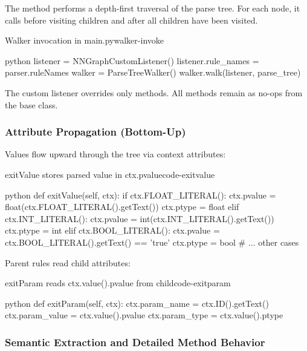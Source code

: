 \documentclass{nngraph-en}
\begin{document}
The  method performs
a depth-first traversal of the parse tree. For each node, it calls
 before visiting children and 
after all children have been visited.

\begin{dfnbox}{Walker invocation in main.py}{walker-invoke}
\begin{amzcode}{python}
listener = NNGraphCustomListener()
listener.rule_names = parser.ruleNames
walker = ParseTreeWalker()
walker.walk(listener, parse_tree)
\end{amzcode}
\end{dfnbox}

The custom listener overrides only  methods. All
 methods remain as no-ops from the base
 class.

\subsubsection{Attribute Propagation (Bottom-Up)}

Values flow upward through the tree via context attributes:

\begin{codebox}{exitValue stores parsed value in ctx.pvalue}{code-exitvalue}
\begin{amzcode}{python}
def exitValue(self, ctx):
    if ctx.FLOAT_LITERAL():
        ctx.pvalue = float(ctx.FLOAT_LITERAL().getText())
        ctx.ptype  = float
    elif ctx.INT_LITERAL():
        ctx.pvalue = int(ctx.INT_LITERAL().getText())
        ctx.ptype  = int
    elif ctx.BOOL_LITERAL():
        ctx.pvalue = ctx.BOOL_LITERAL().getText() == 'true'
        ctx.ptype  = bool
    # ... other cases
\end{amzcode}
\end{codebox}

Parent rules read child attributes:

\begin{codebox}{exitParam reads ctx.value().pvalue from child}{code-exitparam}
\begin{amzcode}{python}
def exitParam(self, ctx):
    ctx.param_name  = ctx.ID().getText()
    ctx.param_value = ctx.value().pvalue
    ctx.param_type  = ctx.value().ptype
\end{amzcode}
\end{codebox}

\subsubsection{Semantic Extraction and Detailed Method Behavior}
\end{document}
